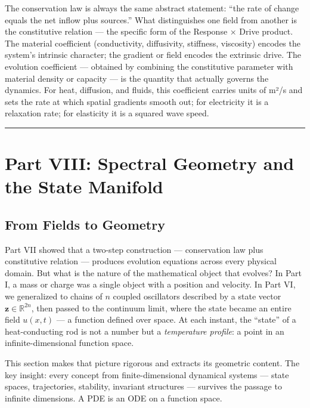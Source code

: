 \documentclass[
  letterpaper,
  DIV=11,
  numbers=noendperiod]{scrartcl}
\begin{document}
The conservation law is always the same abstract statement: ``the rate
of change equals the net inflow plus sources.'' What distinguishes one
field from another is the constitutive relation --- the specific form of
the Response × Drive product. The material coefficient (conductivity,
diffusivity, stiffness, viscosity) encodes the system's intrinsic
character; the gradient or field encodes the extrinsic drive. The
evolution coefficient --- obtained by combining the constitutive
parameter with material density or capacity --- is the quantity that
actually governs the dynamics. For heat, diffusion, and fluids, this
coefficient carries units of m²/s and sets the rate at which spatial
gradients smooth out; for electricity it is a relaxation rate; for
elasticity it is a squared wave speed.

\begin{center}\rule{0.5\linewidth}{0.5pt}\end{center}

\section{Part VIII: Spectral Geometry and the State
Manifold}\label{part-viii-spectral-geometry-and-the-state-manifold}

\subsection{From Fields to Geometry}\label{from-fields-to-geometry}

Part VII showed that a two-step construction --- conservation law plus
constitutive relation --- produces evolution equations across every
physical domain. But what is the nature of the mathematical object that
evolves? In Part I, a mass or charge was a single object with a position
and velocity. In Part VI, we generalized to chains of \(n\) coupled
oscillators described by a state vector
\(\mathbf{z} \in \mathbb{R}^{2n}\), then passed to the continuum limit,
where the state became an entire field \(u(x,t)\) --- a function defined
over space. At each instant, the ``state'' of a heat-conducting rod is
not a number but a \emph{temperature profile}: a point in an
infinite-dimensional function space.

This section makes that picture rigorous and extracts its geometric
content. The key insight: every concept from finite-dimensional
dynamical systems --- state spaces, trajectories, stability, invariant
structures --- survives the passage to infinite dimensions. A PDE is an
ODE on a function space.
\end{document}
